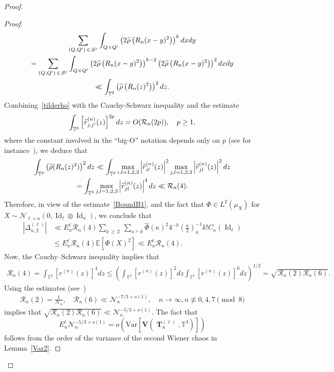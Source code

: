 \documentclass[AHL,Unicode,longabstracts,published]{cedram}
\DeclareMathOperator{\Id}{Id}
\DeclareMathOperator{\bT}{\mathbf{T}}
\newcommand{\scN}{\mathscr{N}}
\newcommand{\bfv}{\mathbf{V}}
\newcommand{\clS}{\mathcal{S}}
\newcommand{\clR}{\mathcal{R}}
\newcommand{\T}{\mathbb{T}^3}
\newcommand{\E}[1]{\mathbb{E}\left[#1\right]}
\newcommand{\V}[1]{\mathrm{Var}{\left[#1\right]}}
\newcommand{\notcon}[3]{ {#1} \not\equiv {#2} \pmod {#3} }
\newcommand{\Nn}{\mathcal{N}_n}
\let\oldtilde\tilde
\renewcommand*{\tilde}[1]{\mathchoice{\widetilde{#1}}{\widetilde{#1}}{\oldtilde{#1}}{\oldtilde{#1}}}
\begin{document}
\begin{proof}
\begin{proof}
\begin{multline*}
\sum_{(Q,Q')\,\in\,\clS^c}
\int_{Q\times Q'}
\left(2 \tilde{\rho}\left(R_n(x-y)^2\right) \right)^{k} dxdy\\
= \sum_{(Q,Q')\,\in\,\clS^c}
\int_{Q\times Q'}
\left(2 \tilde{\rho}\left(R_n(x-y)^2\right) \right)^{k-2}
\left(2 \tilde{\rho}\left(R_n(x-y)^2\right) \right)^{2} dxdy \\
\ll \int_{\T}
\left(\tilde{\rho}\left(R_n(z)^2\right) \right)^{2} dz. \\
\end{multline*}
Combining~\eqref{tilderho} with the Cauchy-Schwarz inequality and the estimate
\begin{gather*}
\int_{\T} \left[\tilde{r}^{(n)}_{j,j'}(z)\right]^{2p} dz = O(\clR_n(2p)), \quad p\geq1,
\end{gather*}
where the constant involved in the ``big-O'' notation depends only on $p$ (see for instance~\cite[Lemma~E.2]{Not20}), we deduce that
\begin{multline*}
\int_{\T}
\left(\tilde{\rho}(R_n(z)^2) \right)^{2} dz
\ll \int_{\T}\max_{i,l=1,2,3} \left| \tilde{r}^{(n)}_{il}(z)\right|^2
\max_{j,l=1,2,3} \left| \tilde{r}^{(n)}_{jl}(z)\right|^2 dz \\
= \int_{\T} \max_{j,l=1,2,3} \left| \tilde{r}^{(n)}_{jl}(z)\right|^4 dz \ll \clR_n(4).
\end{multline*}
Therefore, in view of the estimate~\eqref{BoundB1}, and the fact that $\Phi \in L^2(\mu_X)$ for $X \sim\scN_{\ell\times n}(0,\Id_{\ell}\otimes \Id_n)$, we conclude that
\begin{align*}
\left| \Delta_{n,2}^{(\ell)}\right| &\ll E_n^{\ell} \clR_n(4)
\sum_{k\,\geq\,2}\:
\sum_{\kappa \vdash k}
\widehat{\Phi}(\kappa)^2 4^{-k}
\left(\frac{n}{2}\right)^{-1}_{\kappa} k! C_{\kappa}(\Id_{\ell}) \\
&\leq E_n^{\ell} \clR_n(4) \E{\Phi(X)^2}
\ll E_n^{\ell} \clR_n(4).
\end{align*}
Now, the Cauchy--Schwarz inequality implies that
\begin{gather*}
\clR_n(4) = \int_{\T} \left[r^{(n)}(z)\right]^4 dz
\leq \left(\int_{\T} \left[r^{(n)}(z)\right]^2 dz
\int_{\T} [r^{(n)}(z)]^6 dz
\right)^{1/2} = \sqrt{\clR_n(2) \clR_n(6)}.
\end{gather*}
Using the estimates (see~\cite[Eq.~(1.16) and~(1.18)]{BM17})
\begin{gather*}
\clR_n(2) = \frac{1}{\Nn}, \quad
\clR_n(6) \ll \Nn^{-7/3+o(1)}, \quad n\to\infty,\notcon{n}{0,4,7}{8}
\end{gather*}
implies that $\sqrt{\clR_n(2)\clR_n(6)} \ll \Nn^{-5/3+o(1)}$. The fact that
\[
E_n^{\ell}\Nn^{-5/3+o(1)}=o\left(\V{\bfv\left(\bT_n^{(\ell)},\T\right)}\right)
\]
follows from the order of the variance of the second Wiener chaos in Lemma~\ref{Var2}.
\end{proof}




\end{proof}
\end{document}
